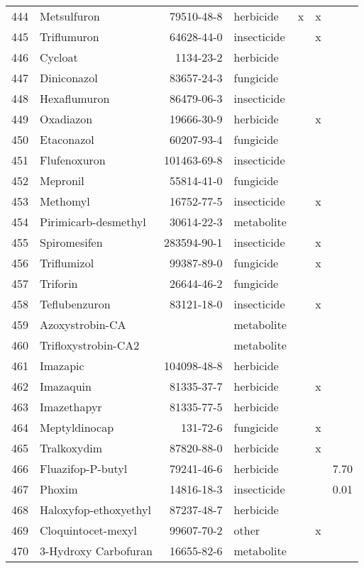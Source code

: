 \begin{longtable}{lp{3cm}rlp{0.5cm}p{0.5cm}p{1cm}}
  444 & Metsulfuron & 79510-48-8 & herbicide & x & x &  \\ 
  445 & Triflumuron & 64628-44-0 & insecticide &  & x &  \\ 
  446 & Cycloat & 1134-23-2 & herbicide &  &  &  \\ 
  447 & Diniconazol & 83657-24-3 & fungicide &  &  &  \\ 
  448 & Hexaflumuron & 86479-06-3 & insecticide &  &  &  \\ 
  449 & Oxadiazon & 19666-30-9 & herbicide &  & x &  \\ 
  450 & Etaconazol & 60207-93-4 & fungicide &  &  &  \\ 
  451 & Flufenoxuron & 101463-69-8 & insecticide &  &  &  \\ 
  452 & Mepronil & 55814-41-0 & fungicide &  &  &  \\ 
  453 & Methomyl & 16752-77-5 & insecticide &  & x &  \\ 
  454 & Pirimicarb-desmethyl & 30614-22-3 & metabolite &  &  &  \\ 
  455 & Spiromesifen & 283594-90-1 & insecticide &  & x &  \\ 
  456 & Triflumizol & 99387-89-0 & fungicide &  & x &  \\ 
  457 & Triforin & 26644-46-2 & fungicide &  &  &  \\ 
  458 & Teflubenzuron & 83121-18-0 & insecticide &  & x &  \\ 
  459 & Azoxystrobin-CA &  & metabolite &  &  &  \\ 
  460 & Trifloxystrobin-CA2 &  & metabolite &  &  &  \\ 
  461 & Imazapic & 104098-48-8 & herbicide &  &  &  \\ 
  462 & Imazaquin & 81335-37-7 & herbicide &  & x &  \\ 
  463 & Imazethapyr & 81335-77-5 & herbicide &  &  &  \\ 
  464 & Meptyldinocap & 131-72-6 & fungicide &  & x &  \\ 
  465 & Tralkoxydim & 87820-88-0 & herbicide &  & x &  \\ 
  466 & Fluazifop-P-butyl & 79241-46-6 & herbicide &  &  & 7.70 \\ 
  467 & Phoxim & 14816-18-3 & insecticide &  &  & 0.01 \\ 
  468 & Haloxyfop-ethoxyethyl & 87237-48-7 & herbicide &  &  &  \\ 
  469 & Cloquintocet-mexyl & 99607-70-2 & other &  & x &  \\ 
  470 & 3-Hydroxy Carbofuran & 16655-82-6 & metabolite &  &  &  \\ 

\end{longtable}
